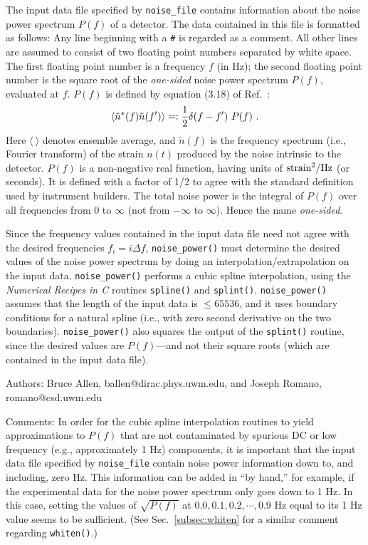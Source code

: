 The input data file specified by {\tt noise\_file} contains information 
about the noise power spectrum $P(f)$ of a detector.
The data contained in this file is formatted as follows:
Any line beginning with a {\tt \#} is regarded as a comment.
All other lines are assumed to consist of two floating point numbers
separated by white space.
The first floating point number is a frequency $f$ (in Hz);
the second floating point number is the square root of the 
{\it one-sided} noise power spectrum $P(f)$, evaluated at $f$.
$P(f)$ is defined by equation (3.18) of 
Ref.~\cite{AllenReview}:
%
\begin{equation}
\langle\tilde n{}^*(f)\tilde n(f')\rangle
=:{1\over 2}\delta(f-f')\ P(f)\ .
\label{e:P(f)}
\end{equation}
%
Here $\langle {\ }\rangle$ denotes ensemble average, and $\tilde n(f)$ 
is the frequency spectrum (i.e., Fourier transform) of the strain $n(t)$ 
produced by the noise intrinsic to the detector.
$P(f)$ is a non-negative real function, having units of
${\rm strain}^2/{\rm Hz}$ (or seconds).
It is defined with a factor of 1/2 to agree with the standard
definition used by instrument builders.
The total noise power is the integral of $P(f)$ over all frequencies
from 0 to $\infty$ (not from $-\infty$ to $\infty$).
Hence the name {\it one-sided}.

Since the frequency values contained in the input data file need not 
agree with the desired frequencies $f_i=i\Delta f$,
{\tt noise\_power()} must determine the desired values of the noise
power spectrum by doing an interpolation/extrapolation on the input data.
{\tt noise\_power()} performs a cubic spline interpolation, using the 
{\it Numerical Recipes in C} routines {\tt spline()} and {\tt splint()}. 
{\tt noise\_power()} assumes that the length of the input 
data is $\le 65536$, and it uses boundary conditions for a natural spline 
(i.e., with zero second derivative on the two boundaries).
{\tt noise\_power()} also squares the output of the {\tt splint()}
routine, since the desired values are $P(f)$---and not their square 
roots (which are contained in the input data file).
%
\begin{description}
\item{Authors:}
Bruce Allen, ballen@dirac.phys.uwm.edu, and Joseph Romano, romano@csd.uwm.edu
\item{Comments:}
In order for the cubic spline interpolation routines to 
yield approximations to $P(f)$ that are not contaminated by spurious DC or 
low frequency (e.g., approximately 1 Hz) components, it is important 
that the input data file specified by {\tt noise\_file} contain noise 
power information down to, and including, zero Hz.
This information can be added in ``by hand,'' for example, if the 
experimental data for the noise power spectrum only goes down to 1 Hz.
In this case, setting the values of $\sqrt{P(f)}$ at 
$0.0, 0.1, 0.2, \cdots, 0.9$ Hz equal to its 1 Hz value seems to be 
sufficient.
(See Sec.~\ref{subsec:whiten} for a similar comment regarding
{\tt whiten()}.)
\end{description}
\clearpage

